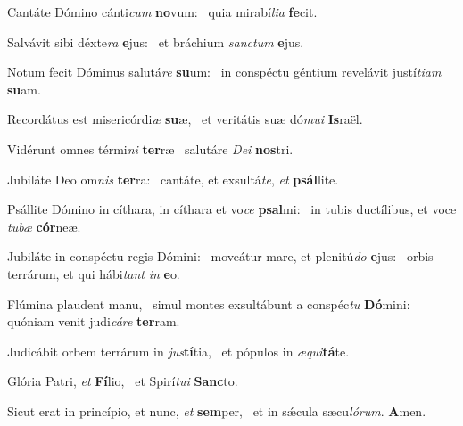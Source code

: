\item Cantáte Dómino cánti\textit{cum} \textbf{no}vum:~\psstar{} quia mirabí\textit{lia} \textbf{fe}cit.
\item Salvávit sibi déxte\textit{ra} \textbf{e}jus:~\psstar{} et bráchium \textit{sanctum} \textbf{e}jus.
\item Notum fecit Dóminus salutá\textit{re} \textbf{su}um:~\psstar{} in conspéctu géntium revelávit justí\textit{tiam} \textbf{su}am.
\item Recordátus est misericórdi\textit{æ} \textbf{su}æ,~\psstar{} et veritátis suæ dó\textit{mui} \textbf{Is}raël.
\item Vidérunt omnes térmi\textit{ni} \textbf{ter}ræ~\psstar{} salutáre \textit{Dei} \textbf{nos}tri.
\item Jubiláte Deo om\textit{nis} \textbf{ter}ra:~\psstar{} cantáte, et exsultá\textit{te}, \textit{et} \textbf{psál}lite.
\item Psállite Dómino in cíthara, in cíthara et vo\textit{ce} \textbf{psal}mi:~\psstar{} in tubis ductílibus, et voce \textit{tubæ} \textbf{cór}neæ.
\item Jubiláte in conspéctu regis Dómini:~\pscross{} moveátur mare, et plenitú\textit{do} \textbf{e}jus:~\psstar{} orbis terrárum, et qui hábi\textit{tant} \textit{in} \textbf{e}o.
\item Flúmina plaudent manu,~\pscross{} simul montes exsultábunt a conspéc\textit{tu} \textbf{Dó}mini:~\psstar{} quóniam venit judi\textit{cáre} \textbf{ter}ram.
\item Judicábit orbem terrárum in \textit{jus}\textbf{tí}tia,~\psstar{} et pópulos in \textit{æqui}\textbf{tá}te.
\item Glória Patri, \textit{et} \textbf{Fí}lio,~\psstar{} et Spirí\textit{tui} \textbf{Sanc}to.
\item Sicut erat in princípio, et nunc, \textit{et} \textbf{sem}per,~\psstar{} et in sǽcula sæcu\textit{lórum}. \textbf{A}men.
